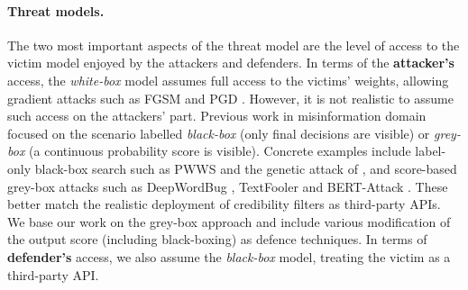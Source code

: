 \documentclass[11pt]{article}
\begin{document}
\paragraph{Threat models.}
The two most important aspects of the threat model are the level of access to the victim model enjoyed by the attackers and defenders. In terms of the \textbf{attacker's} access, the \textit{white-box} model assumes full access to the victims' weights, allowing gradient attacks such as FGSM \citep{Goodfellow2015} and PGD \citep{Madry2018}. However, it is not realistic to assume such access on the attackers' part. Previous work in misinformation domain focused on the scenario labelled \textit{black-box} (only final decisions are visible) or \textit{grey-box} (a continuous probability score is visible). Concrete examples include label-only black-box search such as PWWS \citep{Ren2019} and the genetic attack of \citet{Alzantot2018}, and score-based grey-box attacks such as DeepWordBug \citep{Gao2018}, TextFooler \citep{Jin2020} and BERT-Attack \citep{Li2020bert}. These better match the realistic deployment of credibility filters as third-party APIs. We base our work on the grey-box approach and include various modification of the output score (including black-boxing) as defence techniques. In terms of \textbf{defender's} access, we also assume the \textit{black-box} model, treating the victim as a third-party API.
\end{document}

